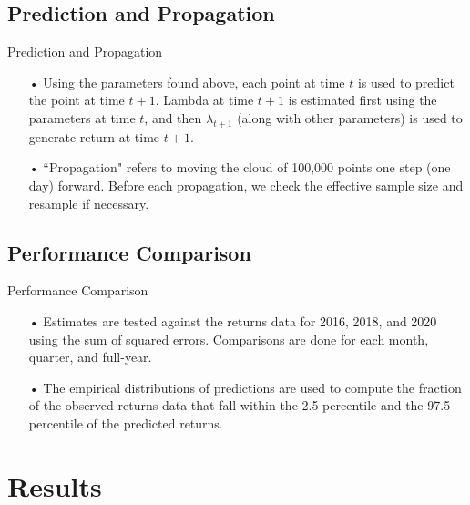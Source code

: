 \documentclass[11pt]{beamer}
\begin{document}
\subsection{Prediction and Propagation}
\begin{frame}{Prediction and Propagation}
\begin{enumerate}
\item[•] Using the parameters found above, each point at time $t$ is used to predict the point at time $t+1$. Lambda at time $t+1$ is estimated first using the parameters at time $t$, and then $\lambda_{t+1}$ (along with other parameters) is used to generate return at time $t+1$. 

\item[•] ``Propagation" refers to moving the cloud of 100,000 points one step (one day) forward. Before each propagation, we check the effective sample size and resample if necessary. 
\end{enumerate}
\end{frame}

\subsection{Performance Comparison}
\begin{frame}{Performance Comparison}
\begin{enumerate}
\item[•] Estimates are tested against the returns data for 2016, 2018, and 2020 using the sum of squared errors. Comparisons are done for each month, quarter, and full-year.

\item[•] The empirical distributions of predictions are used to compute the fraction of the observed returns data that fall within the 2.5 percentile and the 97.5 percentile of the predicted returns.  
\end{enumerate}
\end{frame}

\section{Results}
\end{document}
